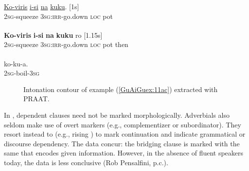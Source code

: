 \documentclass[output=paper]{LSP/langsci}
\begin{document}
\begin{exe}
\ex \label{GuAiGuex:11ac}
\begin{xlist}
\ex \label{GuAiGuex:11a}
\gll \underline{Ko-viris}          \underline{i-si}                 \underline{na}     \underline{kuku}. [1s]\\
\textsc{2sg}-squeeze     \textsc{3sg:irr-}go.down   \textsc{loc}    pot \\
\glt {}\\
\ex \label{GuAiGuex:11b}
\gll \textbf{Ko-viris}          \textbf{i-si}               \textbf{na }    \textbf{kuku}   ro [1.15s] \\
\textsc{2sg}-squeeze     \textsc{3sg:irr-}go.down   \textsc{loc}    pot then\\
\glt {}\\
\ex \label{GuAiGuex:11c}
\gll   ko-ku-a.\\     	       
\textsc{2sg}-boil-\textsc{3sg}\\
\glt {} 
\end{xlist}
\end{exe}

\begin{figure}[ht]
\caption{Intonation contour of example (\ref{GuAiGuex:11ac}) extracted with PRAAT. \label{GuFig3}}
\end{figure}


In , dependent clauses need not be marked morphologically. Adverbials also seldom make use of overt  markers (e.g., complementizer or subordinator). They resort instead to  (e.g., rising ) to mark continuation and indicate grammatical or discourse dependency. The  data concur: the bridging clause is marked with the same  that encodes given information. However, in the absence of fluent speakers today, the  data is less conclusive (Rob Pensalfini, p.c.).\nocite{PRAAT}
\end{document}
